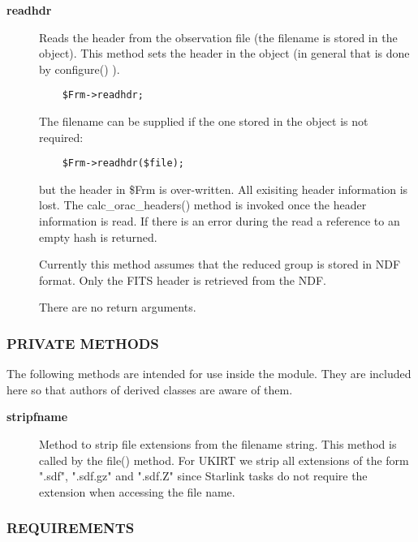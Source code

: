 \begin{description}
\item[\textbf{readhdr}] \mbox{}

Reads the header from the observation file (the filename is stored in
the object).  This method sets the header in the object (in general
that is done by configure() ).

\begin{verbatim}
    $Frm->readhdr;
\end{verbatim}


The filename can be supplied if the one stored in the object
is not required:

\begin{verbatim}
    $Frm->readhdr($file);
\end{verbatim}


but the header in \$Frm is over-written.
All exisiting header information is lost. The calc\_orac\_headers()
method is invoked once the header information is read.
If there is an error during the read a reference to an empty hash is 
returned.



Currently this method assumes that the reduced group is stored in
NDF format. Only the FITS header is retrieved from the NDF.



There are no return arguments.

\end{description}
\subsubsection*{PRIVATE METHODS\label{ORAC::Frame::NDF_PRIVATE_METHODS}}

The following methods are intended for use inside the module.
They are included here so that authors of derived classes are 
aware of them.

\begin{description}
\item[\textbf{stripfname}] \mbox{}

Method to strip file extensions from the filename string. This method
is called by the file() method. For UKIRT we strip all extensions of the
form ".sdf", ".sdf.gz" and ".sdf.Z" since Starlink tasks do not require
the extension when accessing the file name.

\end{description}
\subsubsection*{REQUIREMENTS\label{ORAC::Frame::NDF_REQUIREMENTS}}

